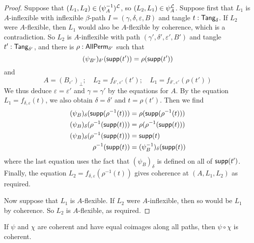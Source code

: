 \begin{proof}
  Suppose that \( (L_1, L_2) \in (\psi^{-1}_A)^{\mathcal L} \), so \( (L_2, L_1) \in \psi_A^{\mathcal L} \).
  Suppose first that \( L_1 \) is \( A \)-inflexible with inflexible \( \beta \)-path \( I = (\gamma, \delta, \varepsilon, B) \) and tangle \( t : \mathsf{Tang}_\delta \).
  If \( L_2 \) were \( A \)-flexible, then \( L_1 \) would also be \( A \)-flexible by coherence, which is a contradiction.
  So \( L_2 \) is \( A \)-inflexible with path \( (\gamma', \delta', \varepsilon', B') \) and tangle \( t' : \mathsf{Tang}_{\delta'} \), and there is \( \rho : \mathsf{AllPerm}_{\delta'} \) such that
  \[ (\psi_{B'})_{\delta'}(\operatorname{\mathsf{supp}}(t')) = \rho(\operatorname{\mathsf{supp}}(t')) \]
  and
  \[ A = (B_{\varepsilon'})_\bot;\quad L_2 = f_{\delta',\varepsilon'}(t');\quad L_1 = f_{\delta',\varepsilon'}(\rho(t')) \]
  We thus deduce \( \varepsilon = \varepsilon' \) and \( \gamma = \gamma' \) by the equations for \( A \).
  By the equation \( L_1 = f_{\delta,\varepsilon}(t) \), we also obtain \( \delta = \delta' \) and \( t = \rho(t') \).
  Then we find
  \begin{align*}
    (\psi_B)_\delta(\operatorname{\mathsf{supp}}(\rho^{-1}(t))) &= \rho(\operatorname{\mathsf{supp}}(\rho^{-1}(t))) \\
    (\psi_B)_\delta(\rho^{-1}(\operatorname{\mathsf{supp}}(t))) &= \rho(\rho^{-1}(\operatorname{\mathsf{supp}}(t))) \\
    (\psi_B)_\delta(\rho^{-1}(\operatorname{\mathsf{supp}}(t))) &= \operatorname{\mathsf{supp}}(t) \\
    \rho^{-1}(\operatorname{\mathsf{supp}}(t)) &= (\psi^{-1}_B)_\delta(\operatorname{\mathsf{supp}}(t))
  \end{align*}
  where the last equation uses the fact that \( (\psi_B)_\delta \) is defined on all of \( \operatorname{\mathsf{supp}}(t') \).
  Finally, the equation \( L_2 = f_{\delta,\varepsilon}(\rho^{-1}(t)) \) gives coherence at \( (A, L_1, L_2) \) as required.

  Now suppose that \( L_1 \) is \( A \)-flexible.
  If \( L_2 \) were \( A \)-inflexible, then so would be \( L_1 \) by coherence.
  So \( L_2 \) is \( A \)-flexible, as required.
\end{proof}
\begin{proposition}
  \label{prop:StrApprox.Coherent.comp}
  If \( \psi \) and \( \chi \) are coherent and have equal coimages along all paths, then \( \psi \circ \chi \) is coherent.
\end{proposition}
